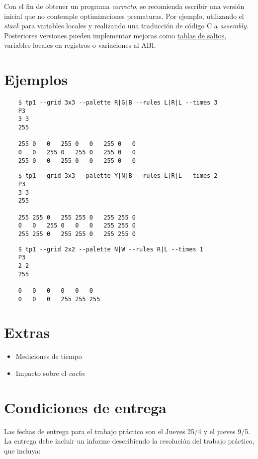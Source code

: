 \documentclass{article}
\begin{document}
Con el fin de obtener un programa \textit{correcto}, se recomienda escribir una versión inicial que no contemple
optimizaciones prematuras. Por ejemplo, utilizando el \textit{stack} para variables locales y realizando una traducción
de código C a \textit{assembly}. Posteriores versiones pueden implementar mejoras como \underline{tablas de saltos},
variables locales en registros o variaciones al ABI.

\section{Ejemplos}

    \begin{verbatim}
    $ tp1 --grid 3x3 --palette R|G|B --rules L|R|L --times 3
    P3
    3 3
    255

    255 0   0   255 0   0   255 0   0
    0   0   255 0   255 0   255 0   0 
    255 0   0   255 0   0   255 0   0
    \end{verbatim}

    \begin{verbatim}
    $ tp1 --grid 3x3 --palette Y|N|B --rules L|R|L --times 2
    P3
    3 3
    255

    255 255 0   255 255 0   255 255 0
    0   0   255 0   0   0   255 255 0
    255 255 0   255 255 0   255 255 0
    \end{verbatim}

    \begin{verbatim}
    $ tp1 --grid 2x2 --palette N|W --rules R|L --times 1
    P3
    2 2
    255

    0   0   0   0   0   0 
    0   0   0   255 255 255
    \end{verbatim}

\section{Extras}
\begin{itemize}
\item Mediciones de tiempo
\item Impacto sobre el \textit{cache}
\end{itemize}

\section{Condiciones de entrega}
Las fechas de entrega para el trabajo práctico son el Jueves 25/4 y el jueves 9/5. La entrega debe incluir un informe
describiendo la resolución del trabajo práctico, que incluya:
\end{document}
